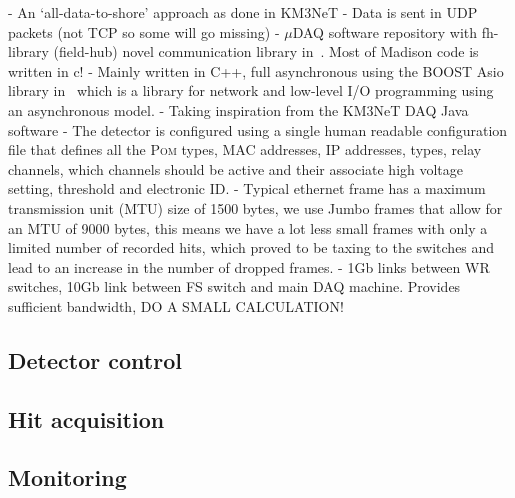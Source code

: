 - An `all-data-to-shore' approach as done in KM3NeT
- Data is sent in UDP packets (not TCP so some will go missing)
- $\mu$DAQ software repository with fh-library (field-hub) novel communication library
in~\cite{microdaq2020}. Most of Madison code is written in c!
- Mainly written in C++, full asynchronous using the BOOST Asio library in~\cite{boost2020} which
is a library for network and low-level I/O programming using an asynchronous model.
- Taking inspiration from the KM3NeT DAQ Java software
- The detector is configured using a single human readable configuration file that defines all the
\textsc{Pom} types, MAC addresses, IP addresses, types, relay channels, which channels should be active and
their associate high voltage setting, threshold and electronic ID.
- Typical ethernet frame has a maximum transmission unit (MTU) size of 1500 bytes, we use Jumbo
frames that allow for an MTU of 9000 bytes, this means we have a lot less small frames with only a
limited number of recorded hits, which proved to be taxing to the switches and lead to an increase
in the number of dropped frames.
- 1Gb links between WR switches, 10Gb link between FS switch and main DAQ machine. Provides
sufficient bandwidth, DO A SMALL CALCULATION!

\subsection{Detector control} %
\label{sec:daq_soft_control} %

\subsection{Hit acquisition} %
\label{sec:daq_soft_hits} %

\subsection{Monitoring} %
\label{sec:daq_soft_monitor} %

